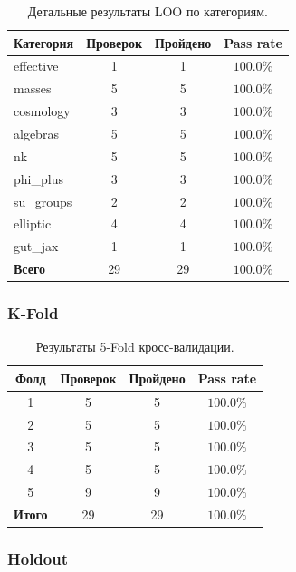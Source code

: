 \documentclass[11pt,a4paper]{article}
\theoremstyle{definition}
\begin{document}
\begin{table}[ht]
\centering
\caption{Детальные результаты LOO по категориям.}
\label{tab:loo-categories}
\begin{tabular}{lccc}
\toprule
Категория & Проверок & Пройдено & Pass rate \\
\midrule
effective    & 1  & 1  & $100.0\%$ \\
masses       & 5  & 5  & $100.0\%$ \\
cosmology    & 3  & 3  & $100.0\%$ \\
algebras     & 5  & 5  & $100.0\%$ \\
nk           & 5  & 5  & $100.0\%$ \\
phi\_plus    & 3  & 3  & $100.0\%$ \\
su\_groups   & 2  & 2  & $100.0\%$ \\
elliptic     & 4  & 4  & $100.0\%$ \\
gut\_jax     & 1  & 1  & $100.0\%$ \\
\midrule
\textbf{Всего} & 29 & 29 & $\mathbf{100.0\%}$ \\
\bottomrule
\end{tabular}
\end{table}

\subsubsection{K-Fold}

\begin{table}[ht]
\centering
\caption{Результаты 5-Fold кросс-валидации.}
\label{tab:kfold-main}
\begin{tabular}{cccc}
\toprule
Фолд & Проверок & Пройдено & Pass rate \\
\midrule
1 & 5 & 5 & $100.0\%$ \\
2 & 5 & 5 & $100.0\%$ \\
3 & 5 & 5 & $100.0\%$ \\
4 & 5 & 5 & $100.0\%$ \\
5 & 9 & 9 & $100.0\%$ \\
\midrule
\textbf{Итого} & 29 & 29 & $\mathbf{100.0\%}$ \\
\bottomrule
\end{tabular}
\end{table}

\subsubsection{Holdout}
\end{document}
